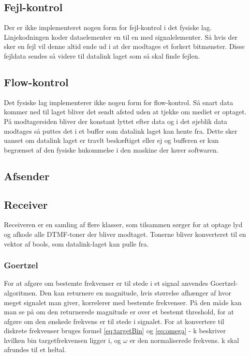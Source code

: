 \subsection{Fejl-kontrol}
Der er ikke implementeret nogen form for fejl-kontrol i det fysiske lag. Linjekodningen koder dataelementer en til en med signalelementer. Så hvis der sker en fejl vil denne altid ende ud i at der modtages et forkert bitmønster. Disse fejldata sendes så videre til datalink laget som så skal finde fejlen.

\subsection{Flow-kontrol}
Det fysiske lag implementerer ikke nogen form for flow-kontrol. Så snart data kommer ned til laget bliver det sendt afsted uden at tjekke om mediet er optaget. På modtagersiden bliver der konstant lyttet efter data og i det øjeblik data modtages så puttes det i et buffer som datalink laget kan hente fra. Dette sker uanset om datalink laget er travlt beskæftiget eller ej og bufferen er kun begrænset af den fysiske hukommelse i den maskine der kører softwaren.

\subsection{Afsender}



\subsection{Receiver}
Receiveren er en samling af flere klasser, som tilsammen sørger for at optage lyd og afkode alle DTMF-toner der bliver modtaget. Tonerne bliver konverteret til en vektor af bools, som datalink-laget kan pulle fra.

\subsubsection{Goertzel}

For at afgøre om bestemte frekvenser er til stede i et signal anvendes Goertzel-algoritmen. Den kan returnere en magnitude, hvis størrelse afhænger af hvor meget signalet man giver, korrelerer med bestemte frekvenser. På den måde kan man se på om den returnerede magnitude er over et bestemt threshold, for at afgøre om den ønskede frekvens er til stede i signalet. 
For at konvertere til diskrete frekvenser bruges formel \eqref{eq:targetBin} og \eqref{eq:omega} - k beskriver hvilken bin targetfrekvensen ligger i, og $\omega$ er den normaliserede frekvens. k skal afrundes til et heltal.

